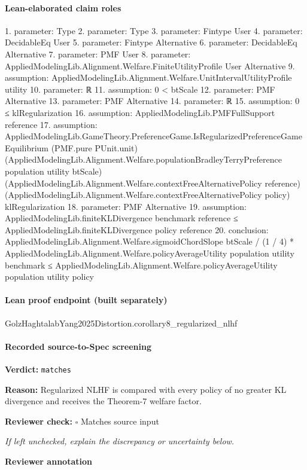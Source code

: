 \documentclass[10pt]{article}
\newcommand{\reviewerbox}{%
  \par\noindent\fbox{\parbox{0.96\linewidth}{\rule{0pt}{0.38in}}}\par
}
\newcommand{\reviewmatch}[1]{%
  \par\noindent\textbf{Reviewer check:} $\square$\; #1\par
  \noindent\emph{If left unchecked, explain the discrepancy or uncertainty below.}\par
}
\begin{document}
\paragraph{Lean-elaborated claim roles}\begin{ReviewVerbatim}
1. parameter: Type
2. parameter: Type
3. parameter: Fintype User
4. parameter: DecidableEq User
5. parameter: Fintype Alternative
6. parameter: DecidableEq Alternative
7. parameter: PMF User
8. parameter: AppliedModelingLib.Alignment.Welfare.FiniteUtilityProfile User Alternative
9. assumption: AppliedModelingLib.Alignment.Welfare.UnitIntervalUtilityProfile utility
10. parameter: ℝ
11. assumption: 0 < btScale
12. parameter: PMF Alternative
13. parameter: PMF Alternative
14. parameter: ℝ
15. assumption: 0 ≤ klRegularization
16. assumption: AppliedModelingLib.PMFFullSupport reference
17. assumption: AppliedModelingLib.GameTheory.PreferenceGame.IsRegularizedPreferenceGameEquilibrium (PMF.pure PUnit.unit)
  (AppliedModelingLib.Alignment.Welfare.populationBradleyTerryPreference population utility btScale)
  (AppliedModelingLib.Alignment.Welfare.contextFreeAlternativePolicy reference)
  (AppliedModelingLib.Alignment.Welfare.contextFreeAlternativePolicy policy) klRegularization
18. parameter: PMF Alternative
19. assumption: AppliedModelingLib.finiteKLDivergence benchmark reference ≤ AppliedModelingLib.finiteKLDivergence policy reference
20. conclusion: AppliedModelingLib.Alignment.Welfare.sigmoidChordSlope btScale / (1 / 4) *
    AppliedModelingLib.Alignment.Welfare.policyAverageUtility population utility benchmark ≤
  AppliedModelingLib.Alignment.Welfare.policyAverageUtility population utility policy
\end{ReviewVerbatim}

\paragraph{Lean proof endpoint (built separately)}\begin{ReviewVerbatim}
GolzHaghtalabYang2025Distortion.corollary8_regularized_nlhf
\end{ReviewVerbatim}

\paragraph{Recorded source-to-Spec screening}
\textbf{Verdict:} \texttt{matches}
\\
{\raggedright
\textbf{Reason:} Regularized NLHF is compared with every policy of no greater KL divergence and receives the Theorem-\allowbreak{}7 welfare factor.\allowbreak{}
\par}
\reviewmatch{Matches source input}
\noindent\textbf{Reviewer annotation}\par
\reviewerbox
\clearpage
\hypertarget{source-claim-ddcbcef3944ac5d9}{}
\end{document}
